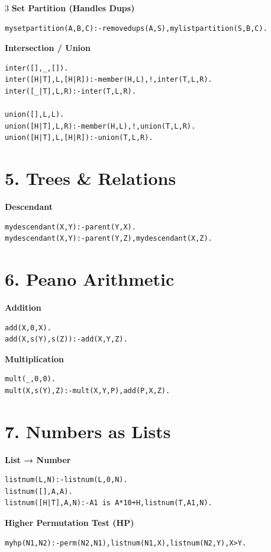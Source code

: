 \documentclass[8pt,landscape]{article}
\begin{document}
\begin{multicols*}{3}
\textbf{Set Partition (Handles Dups)}
\begin{lstlisting}
mysetpartition(A,B,C):-removedups(A,S),mylistpartition(S,B,C).
\end{lstlisting}

\textbf{Intersection / Union}
\begin{lstlisting}
inter([],_,[]).
inter([H|T],L,[H|R]):-member(H,L),!,inter(T,L,R).
inter([_|T],L,R):-inter(T,L,R).

union([],L,L).
union([H|T],L,R):-member(H,L),!,union(T,L,R).
union([H|T],L,[H|R]):-union(T,L,R).
\end{lstlisting}

\section*{5. Trees \& Relations}

\textbf{Descendant}
\begin{lstlisting}
mydescendant(X,Y):-parent(Y,X).
mydescendant(X,Y):-parent(Y,Z),mydescendant(X,Z).
\end{lstlisting}

\section*{6. Peano Arithmetic}

\textbf{Addition}
\begin{lstlisting}
add(X,0,X).
add(X,s(Y),s(Z)):-add(X,Y,Z).
\end{lstlisting}

\textbf{Multiplication}
\begin{lstlisting}
mult(_,0,0).
mult(X,s(Y),Z):-mult(X,Y,P),add(P,X,Z).
\end{lstlisting}

\section*{7. Numbers as Lists}

\textbf{List → Number}
\begin{lstlisting}
listnum(L,N):-listnum(L,0,N).
listnum([],A,A).
listnum([H|T],A,N):-A1 is A*10+H,listnum(T,A1,N).
\end{lstlisting}

\textbf{Higher Permutation Test (HP)}
\begin{lstlisting}
myhp(N1,N2):-perm(N2,N1),listnum(N1,X),listnum(N2,Y),X>Y.
\end{lstlisting}


\end{multicols*}
\end{document}
